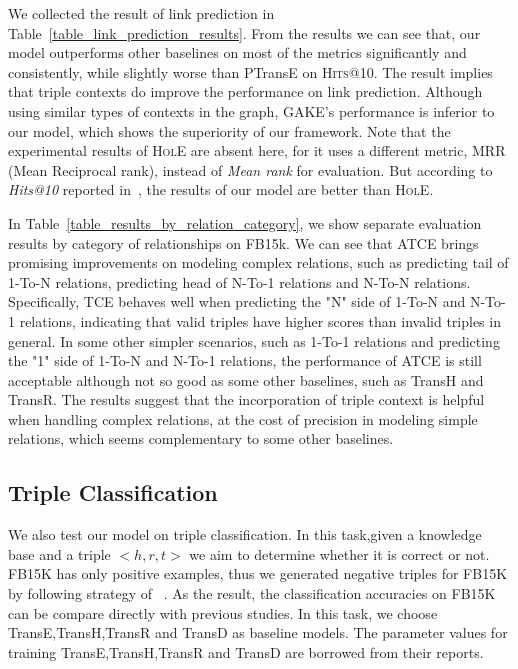 We collected the result of link prediction in Table~\ref{table_link_prediction_results}. From the results we can see that, our model outperforms other baselines on most of the metrics significantly and consistently, while slightly worse than PTransE on \textsc{Hits}@10. The result implies that triple contexts do improve the performance on link prediction. Although using similar types of contexts in the graph, GAKE's performance is inferior to our model, which shows the superiority of our framework. Note that the experimental results of \textsc{HolE} are absent here, for it uses a different metric, MRR (Mean Reciprocal rank), instead of \textit{Mean rank} for evaluation. But according to \textit{Hits@10} reported in~\cite{NickelRP16}, the results of our model are better than \textsc{HolE}.



In Table~\ref{table_results_by_relation_category}, we show separate evaluation results by category of relationships on FB15k. We can see that ATCE brings promising improvements on modeling complex relations, such as predicting tail of 1-To-N relations, predicting head of N-To-1 relations and N-To-N relations. Specifically, TCE behaves well when predicting the "N" side of 1-To-N and N-To-1 relations, indicating that valid triples have higher scores than invalid triples in general. In some other simpler scenarios, such as 1-To-1 relations and predicting the "1" side of 1-To-N and N-To-1 relations, the performance of ATCE is still acceptable although not so good as some other baselines, such as TransH and TransR. The results suggest that the incorporation of triple context is helpful when handling complex relations, at the cost of precision in modeling simple relations, which seems complementary to some other baselines.
\subsection{Triple Classification}
We also test our model on triple classification. In this task,given a knowledge base and a triple $<h,r,t>$ we aim to determine whether it is correct or not. FB15K has only positive examples, thus we generated negative triples for FB15K by following strategy of ~\cite{socher2013}. As the result, the classification accuracies on FB15K can be compare directly with previous studies. In this task, we choose TransE,TransH,TransR and TransD as baseline models. The parameter values for training TransE,TransH,TransR and TransD are borrowed from their reports.

